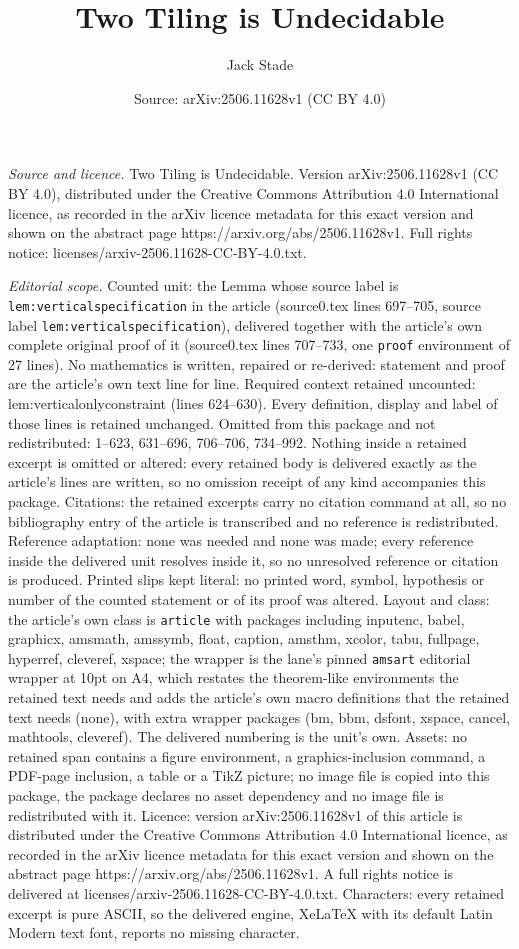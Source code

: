 \documentclass[10pt,a4paper]{amsart}
\title[Two Tiling is Undecidable]{Two Tiling is Undecidable}
\author{Jack Stade}
\date{Source: arXiv:2506.11628v1 (CC BY 4.0)}
\begin{document}
\maketitle

\noindent\emph{Source and licence.} Two Tiling is Undecidable. Version arXiv:2506.11628v1 (CC BY 4.0), distributed under the Creative Commons Attribution 4.0 International licence, as recorded in the arXiv licence metadata for this exact version and shown on the abstract page https://arxiv.org/abs/2506.11628v1. Full rights notice: licenses/arxiv-2506.11628-CC-BY-4.0.txt.\par\smallskip

\noindent\textit{Editorial scope.} Counted unit: the Lemma whose source label is \texttt{lem:verticalspecification} in the article (source0.tex lines 697--705, source label \texttt{lem:verticalspecification}), delivered together with the article's own complete original proof of it (source0.tex lines 707--733, one \texttt{proof} environment of 27 lines). No mathematics is written, repaired or re-derived: statement and proof are the article's own text line for line. Required context retained uncounted: lem:verticalonlyconstraint (lines 624--630). Every definition, display and label of those lines is retained unchanged. Omitted from this package and not redistributed: 1--623, 631--696, 706--706, 734--992. Nothing inside a retained excerpt is omitted or altered: every retained body is delivered exactly as the article's lines are written, so no omission receipt of any kind accompanies this package. Citations: the retained excerpts carry no citation command at all, so no bibliography entry of the article is transcribed and no reference is redistributed. Reference adaptation: none was needed and none was made; every reference inside the delivered unit resolves inside it, so no unresolved reference or citation is produced. Printed slips kept literal: no printed word, symbol, hypothesis or number of the counted statement or of its proof was altered. Layout and class: the article's own class is \texttt{article} with packages including inputenc, babel, graphicx, amsmath, amssymb, float, caption, amsthm, xcolor, tabu, fullpage, hyperref, cleveref, xspace; the wrapper is the lane's pinned \texttt{amsart} editorial wrapper at 10pt on A4, which restates the theorem-like environments the retained text needs and adds the article's own macro definitions that the retained text needs (none), with extra wrapper packages (bm, bbm, dsfont, xspace, cancel, mathtools, cleveref). The delivered numbering is the unit's own. Assets: no retained span contains a figure environment, a graphics-inclusion command, a PDF-page inclusion, a table or a TikZ picture; no image file is copied into this package, the package declares no asset dependency and no image file is redistributed with it. Licence: version arXiv:2506.11628v1 of this article is distributed under the Creative Commons Attribution 4.0 International licence, as recorded in the arXiv licence metadata for this exact version and shown on the abstract page https://arxiv.org/abs/2506.11628v1. A full rights notice is delivered at licenses/arxiv-2506.11628-CC-BY-4.0.txt. Characters: every retained excerpt is pure ASCII, so the delivered engine, XeLaTeX with its default Latin Modern text font, reports no missing character.
\end{document}

